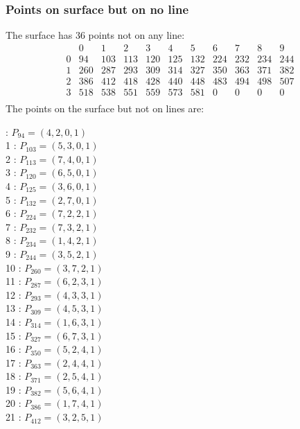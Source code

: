 \documentclass{article}
\begin{document}
{\subsubsection*{Points on surface but on no line}
The surface has 36 points not on any line:\\
$$
\begin{array}{r|*{10}{r}}
 & 0 & 1 & 2 & 3 & 4 & 5 & 6 & 7 & 8 & 9\\
\hline
0 & 94 & 103 & 113 & 120 & 125 & 132 & 224 & 232 & 234 & 244\\
1 & 260 & 287 & 293 & 309 & 314 & 327 & 350 & 363 & 371 & 382\\
2 & 386 & 412 & 418 & 428 & 440 & 448 & 483 & 494 & 498 & 507\\
3 & 518 & 538 & 551 & 559 & 573 & 581 & 0 & 0 & 0 & 0\\
\end{array}
$$
The points on the surface but not on lines are:\\
\begin{multicols}{2}
 : $P_{94}=( 4, 2, 0, 1 )$\\
1 : $P_{103}=( 5, 3, 0, 1 )$\\
2 : $P_{113}=( 7, 4, 0, 1 )$\\
3 : $P_{120}=( 6, 5, 0, 1 )$\\
4 : $P_{125}=( 3, 6, 0, 1 )$\\
5 : $P_{132}=( 2, 7, 0, 1 )$\\
6 : $P_{224}=( 7, 2, 2, 1 )$\\
7 : $P_{232}=( 7, 3, 2, 1 )$\\
8 : $P_{234}=( 1, 4, 2, 1 )$\\
9 : $P_{244}=( 3, 5, 2, 1 )$\\
10 : $P_{260}=( 3, 7, 2, 1 )$\\
11 : $P_{287}=( 6, 2, 3, 1 )$\\
12 : $P_{293}=( 4, 3, 3, 1 )$\\
13 : $P_{309}=( 4, 5, 3, 1 )$\\
14 : $P_{314}=( 1, 6, 3, 1 )$\\
15 : $P_{327}=( 6, 7, 3, 1 )$\\
16 : $P_{350}=( 5, 2, 4, 1 )$\\
17 : $P_{363}=( 2, 4, 4, 1 )$\\
18 : $P_{371}=( 2, 5, 4, 1 )$\\
19 : $P_{382}=( 5, 6, 4, 1 )$\\
20 : $P_{386}=( 1, 7, 4, 1 )$\\
21 : $P_{412}=( 3, 2, 5, 1 )$\\

\end{multicols}}
\end{document}
